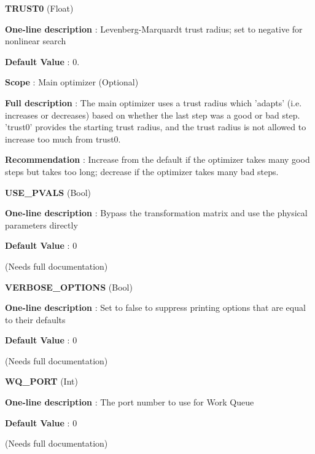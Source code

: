 \begin{DoxyItemize}
\item {\bfseries  T\-R\-U\-S\-T0 } (Float) \par
{\bfseries  One-\/line description }\-: Levenberg-\/\-Marquardt trust radius; set to negative for nonlinear search \par
{\bfseries  Default Value }\-: 0. \par
{\bfseries  Scope }\-: Main optimizer (Optional) \par
{\bfseries  Full description }\-: The main optimizer uses a trust radius which 'adapts' (i.\-e. increases or decreases) based on whether the last step was a good or bad step. 'trust0' provides the starting trust radius, and the trust radius is not allowed to increase too much from trust0. \par
{\bfseries  Recommendation }\-: Increase from the default if the optimizer takes many good steps but takes too long; decrease if the optimizer takes many bad steps.\end{DoxyItemize}
\begin{DoxyItemize}
\item {\bfseries  U\-S\-E\-\_\-\-P\-V\-A\-L\-S } (Bool) \par
{\bfseries  One-\/line description }\-: Bypass the transformation matrix and use the physical parameters directly \par
{\bfseries  Default Value }\-: 0 \par
(Needs full documentation)\end{DoxyItemize}
\begin{DoxyItemize}
\item {\bfseries  V\-E\-R\-B\-O\-S\-E\-\_\-\-O\-P\-T\-I\-O\-N\-S } (Bool) \par
{\bfseries  One-\/line description }\-: Set to false to suppress printing options that are equal to their defaults \par
{\bfseries  Default Value }\-: 0 \par
(Needs full documentation)\end{DoxyItemize}
\begin{DoxyItemize}
\item {\bfseries  W\-Q\-\_\-\-P\-O\-R\-T } (Int) \par
{\bfseries  One-\/line description }\-: The port number to use for Work Queue \par
{\bfseries  Default Value }\-: 0 \par
(Needs full documentation)\end{DoxyItemize}
